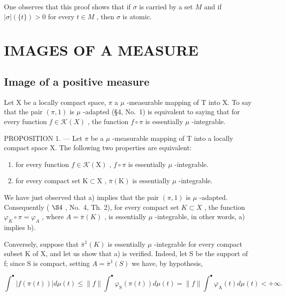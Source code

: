 One observes that this proof shows that if \(\sigma\) is carried by a set \(M\) and if \(|\sigma| (\{t\}) > 0\) for every \(t \in M\) , then \(\sigma\) is atomic.

\section{IMAGES OF A MEASURE}

\subsection{Image of a positive measure}

Let X be a locally compact space, \(\pi\) a \(\mu\) -measurable mapping of T into X. To say that the pair \((\pi,1)\) is \(\mu\) -adapted (§4, No.~1) is equivalent to saying that for every function \(f \in \mathcal{K}(X)\) , the function \(f \circ \pi\) is essentially \(\mu\) -integrable.

PROPOSITION 1. --- Let \(\pi\) be a \(\mu\) -measurable mapping of T into a locally compact space X. The following two properties are equivalent:

\begin{enumerate}
\def\labelenumi{\alph{enumi})}
\item
  for every function \(f \in \mathcal{K}(\mathrm{X})\) , \(f \circ \pi\) is essentially \(\mu\) -integrable.
\item
  for every compact set \(\mathrm{K}\subset \mathrm{X}\) , \(\overline{\pi} (\mathrm{K})\) is essentially \(\mu\) -integrable.
\end{enumerate}

We have just observed that a) implies that the pair \((\pi,1)\) is \(\mu\) -adapted. Consequently ( \(\S4\) , No.~4, Th. 2), for every compact set \(K\subset X\) , the function \(\varphi_{K}\circ\pi=\varphi_{A}\) , where \(A=\overline{\pi}(K)\) , is essentially \(\mu\) -integrable, in other words, a) implies b).

Conversely, suppose that \(\overline{\pi}^{1}(K)\) is essentially \(\mu\) -integrable for every compact subset K of X, and let us show that a) is verified. Indeed, let S be the support of f; since S is compact, setting \(A = \overline{\pi}^{1}(S)\) we have, by hypothesis,

\[
\int^ {\bullet} \left| f (\pi (t)) \right| d \mu (t) \leqslant \| f \| \int^ {\bullet} \varphi_ {\mathrm{S}} (\pi (t)) d \mu (t) = \| f \| \int^ {\bullet} \varphi_ {\mathrm{A}} (t) d \mu (t) <   + \infty .
\]

